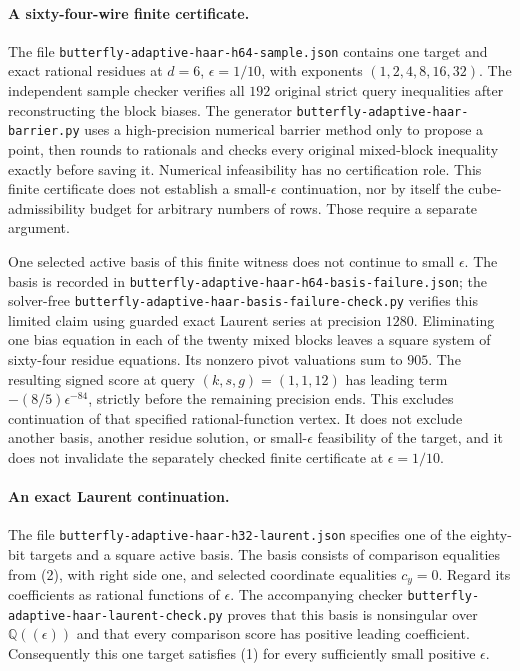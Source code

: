 \documentclass[11pt]{article}
\begin{document}
\paragraph{A sixty-four-wire finite certificate.}
The file \texttt{butterfly-adaptive-haar-h64-sample.json} contains one
target and exact rational residues at $d=6$, $\epsilon=1/10$, with
exponents $(1,2,4,8,16,32)$. The independent sample checker verifies
all $192$ original strict query inequalities after reconstructing the
block biases. The generator \texttt{butterfly-adaptive-haar-barrier.py}
uses a high-precision numerical barrier method only to propose a point,
then rounds to rationals and checks every original mixed-block
inequality exactly before saving it. Numerical infeasibility has no
certification role. This finite certificate does not establish a
small-$\epsilon$ continuation, nor by itself the cube-admissibility
budget for arbitrary numbers of rows. Those require a separate argument.

One selected active basis of this finite witness does not continue to
small $\epsilon$. The basis is recorded in
\texttt{butterfly-adaptive-haar-h64-basis-failure.json}; the solver-free
\texttt{butterfly-adaptive-haar-basis-failure-check.py} verifies this
limited claim using guarded exact Laurent series at precision $1280$.
Eliminating one bias equation in each of the twenty mixed blocks leaves
a square system of sixty-four residue equations. Its nonzero pivot
valuations sum to $905$. The resulting signed score at query
$(k,s,g)=(1,1,12)$ has leading term
$-(8/5)\epsilon^{-84}$, strictly before the remaining precision ends.
This excludes continuation of that specified rational-function vertex.
It does not exclude another basis, another residue solution, or
small-$\epsilon$ feasibility of the target, and it does not invalidate
the separately checked finite certificate at $\epsilon=1/10$.


\paragraph{An exact Laurent continuation.}
The file \texttt{butterfly-adaptive-haar-h32-laurent.json} specifies one
of the eighty-bit targets and a square active basis. The basis consists
of comparison equalities from (2), with right side one, and selected
coordinate equalities $c_y=0$. Regard its coefficients as rational
functions of $\epsilon$. The accompanying checker
\texttt{butterfly-adaptive-haar-laurent-check.py} proves that this basis
is nonsingular over $\mathbb Q((\epsilon))$ and that every comparison
score has positive leading coefficient. Consequently this one target
satisfies (1) for every sufficiently small positive $\epsilon$.
\end{document}
